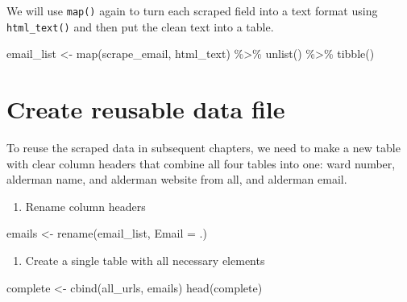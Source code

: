 \documentclass[
  krantz2]{krantz}
\makeatletter
\newenvironment{Shaded}{\begin{snugshade}}{\end{snugshade}}
\newcommand{\AttributeTok}[1]{\textcolor[rgb]{0.61,0.61,0.61}{#1}}
\newcommand{\FunctionTok}[1]{\textcolor[rgb]{0,0,0}{#1}}
\newcommand{\NormalTok}[1]{#1}
\newcommand{\OtherTok}[1]{\textcolor[rgb]{0.37,0.37,0.37}{#1}}
\newcommand{\SpecialCharTok}[1]{\textcolor[rgb]{0,0,0}{#1}}
\providecommand{\tightlist}{%
  \setlength{\itemsep}{0pt}\setlength{\parskip}{0pt}}
\newenvironment{kframe}{%
\medskip{}
\setlength{\fboxsep}{.8em}
 \def\at@end@of@kframe{}%
 \ifinner\ifhmode%
  \def\at@end@of@kframe{\end{minipage}}%
  \begin{minipage}{\columnwidth}%
 \fi\fi%
 \def\FrameCommand##1{\hskip\@totalleftmargin \hskip-\fboxsep
 \colorbox{shadecolor}{##1}\hskip-\fboxsep
     \hskip-\linewidth \hskip-\@totalleftmargin \hskip\columnwidth}%
 \MakeFramed {\advance\hsize-\width
   \@totalleftmargin\z@ \linewidth\hsize
   \@setminipage}}%
 {\par\unskip\endMakeFramed%
 \at@end@of@kframe}
\renewenvironment{Shaded}{\begin{kframe}}{\end{kframe}}
\makeatother
\begin{document}
We will use \texttt{map()} again to turn each scraped field into a text format using \texttt{html\_text()} and then put the clean text into a table.

\begin{Shaded}
\begin{Highlighting}[]
\NormalTok{email\_list }\OtherTok{\textless{}{-}} \FunctionTok{map}\NormalTok{(scrape\_email, html\_text) }\SpecialCharTok{\%\textgreater{}\%}
  \FunctionTok{unlist}\NormalTok{() }\SpecialCharTok{\%\textgreater{}\%}
  \FunctionTok{tibble}\NormalTok{()}
\end{Highlighting}
\end{Shaded}

\hypertarget{csv-file}{%
\section{Create reusable data file}\label{csv-file}}

To reuse the scraped data in subsequent chapters, we need to make a new table with clear column headers that combine all four tables into one: ward number, alderman name, and alderman website from all, and alderman email.

\begin{enumerate}
\def\labelenumi{\arabic{enumi}.}
\tightlist
\item
  Rename column headers
\end{enumerate}

\begin{Shaded}
\begin{Highlighting}[]
\NormalTok{emails }\OtherTok{\textless{}{-}} \FunctionTok{rename}\NormalTok{(email\_list, }\AttributeTok{Email =}\NormalTok{ .)}
\end{Highlighting}
\end{Shaded}

\begin{enumerate}
\def\labelenumi{\arabic{enumi}.}
\setcounter{enumi}{1}
\tightlist
\item
  Create a single table with all necessary elements
\end{enumerate}

\begin{Shaded}
\begin{Highlighting}[]
\NormalTok{complete }\OtherTok{\textless{}{-}} \FunctionTok{cbind}\NormalTok{(all\_urls, emails)}
\FunctionTok{head}\NormalTok{(complete)}
\end{Highlighting}
\end{Shaded}
\end{document}
